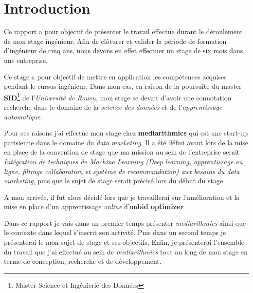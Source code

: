 \section*{Introduction}

Ce rapport a pour objectif de présenter le travail effectue durant le déroulement de mon stage ingénieur. 
Afin de clôturer et valider la période de formation d'ingénieur de cinq ans, nous devons en effet effectuer un stage de
six mois dans une entreprise. \par
Ce stage a pour objectif de mettre en application les compétences acquises pendant le cursus
ingénieur. Dans mon cas, en raison de la poursuite du master \textbf{SID}\footnote{Master Science et Ingénierie des Données} de l'\emph{Université de Rouen},
mon  stage se devait d'avoir une connotation recherche dans le domaine de la \emph{science des données} et de l'\emph{apprentissage automatique}. \par
Pour ces raisons j'ai effectue mon stage chez \textbf{mediarithmics} qui est une start-up parisienne
dans le domaine du \emph{data marketing}. Il a été défini avant lors de la mise en place de la convention de stage
que ma mission au sein de l'entreprise serait \emph{Intégration de techniques de Machine Learning (Deep learning, apprentissage en ligne, filtrage collaboration et système de recommandation) aux besoins du data marketing}, puis que le sujet de stage serait précisé lors du début du stage.  \par
A mon arrivée, il fut alors décidé lors que je travaillerai sur l'amélioration et la mise en place d'un apprentissage \emph{online} d'un\textbf{bid optimizer} \par

Dans ce rapport je vais dans un premier temps présenter \emph{mediarithmics} ainsi que le contexte dans lequel s'inscrit son activité. Puis dans un second temps je présenterai le mon sujet de stage et ses objectifs, Enfin, je présenterai l'ensemble du travail que j'ai effectué au sein de \emph{mediarithmics} tout au long de mon stage en terme de conception, recherche et de développement.